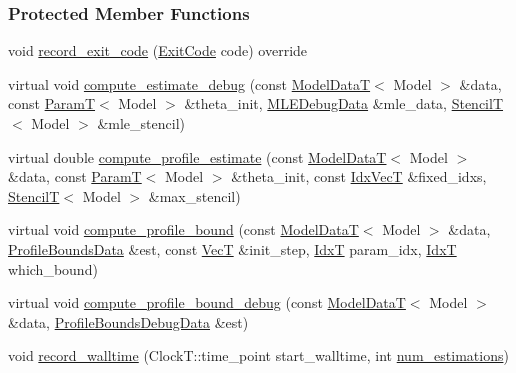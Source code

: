 \subsubsection*{Protected Member Functions}
\begin{DoxyCompactItemize}
\item 
void \hyperlink{classmappel_1_1estimator_1_1ThreadedEstimator_ae5fe99504a34bfd854915a2156ed462c}{record\+\_\+exit\+\_\+code} (\hyperlink{namespacemappel_1_1estimator_ae49999202b8a1968bc308aa30ac24e6c}{Exit\+Code} code) override
\item 
virtual void \hyperlink{classmappel_1_1estimator_1_1Estimator_a59710205cc6b04fe84b171d9bc4b5d1c}{compute\+\_\+estimate\+\_\+debug} (const \hyperlink{namespacemappel_a97f050df953605381ae9c901c3b125f1}{Model\+DataT}$<$ Model $>$ \&data, const \hyperlink{namespacemappel_a667925cb0d6c0e49f2f035cc5a9a6857}{ParamT}$<$ Model $>$ \&theta\+\_\+init, \hyperlink{structmappel_1_1estimator_1_1MLEDebugData}{M\+L\+E\+Debug\+Data} \&mle\+\_\+data, \hyperlink{namespacemappel_a3a06598240007876f8c4bf834ad86197}{StencilT}$<$ Model $>$ \&mle\+\_\+stencil)
\item 
virtual double \hyperlink{classmappel_1_1estimator_1_1Estimator_a99486218b65fb20baa8af8234fc9f10a}{compute\+\_\+profile\+\_\+estimate} (const \hyperlink{namespacemappel_a97f050df953605381ae9c901c3b125f1}{Model\+DataT}$<$ Model $>$ \&data, const \hyperlink{namespacemappel_a667925cb0d6c0e49f2f035cc5a9a6857}{ParamT}$<$ Model $>$ \&theta\+\_\+init, const \hyperlink{namespacemappel_ac63743dcd42180127307cd0e4ecdd784}{Idx\+VecT} \&fixed\+\_\+idxs, \hyperlink{namespacemappel_a3a06598240007876f8c4bf834ad86197}{StencilT}$<$ Model $>$ \&max\+\_\+stencil)
\item 
virtual void \hyperlink{classmappel_1_1estimator_1_1Estimator_a83f877d399368dee1f10cc905d833a85}{compute\+\_\+profile\+\_\+bound} (const \hyperlink{namespacemappel_a97f050df953605381ae9c901c3b125f1}{Model\+DataT}$<$ Model $>$ \&data, \hyperlink{structmappel_1_1estimator_1_1ProfileBoundsData}{Profile\+Bounds\+Data} \&est, const \hyperlink{namespacemappel_a2225ad69f358daa3f4f99282a35b9a3a}{VecT} \&init\+\_\+step, \hyperlink{namespacemappel_ab17ec0f30b61ece292439d7ece81d3a8}{IdxT} param\+\_\+idx, \hyperlink{namespacemappel_ab17ec0f30b61ece292439d7ece81d3a8}{IdxT} which\+\_\+bound)
\item 
virtual void \hyperlink{classmappel_1_1estimator_1_1Estimator_a75c8db8e3151aa5bb2ce3190a613c05c}{compute\+\_\+profile\+\_\+bound\+\_\+debug} (const \hyperlink{namespacemappel_a97f050df953605381ae9c901c3b125f1}{Model\+DataT}$<$ Model $>$ \&data, \hyperlink{namespacemappel_1_1estimator_structmappel_1_1estimator_1_1ProfileBoundsDebugData}{Profile\+Bounds\+Debug\+Data} \&est)
\item 
void \hyperlink{classmappel_1_1estimator_1_1Estimator_a864a87d5dc2937e1d67e6bcffb0b5234}{record\+\_\+walltime} (Clock\+T\+::time\+\_\+point start\+\_\+walltime, int \hyperlink{classmappel_1_1estimator_1_1Estimator_a9f5390f0ac3ee127ddcd90dc6f4fd889}{num\+\_\+estimations})
\end{DoxyCompactItemize}
